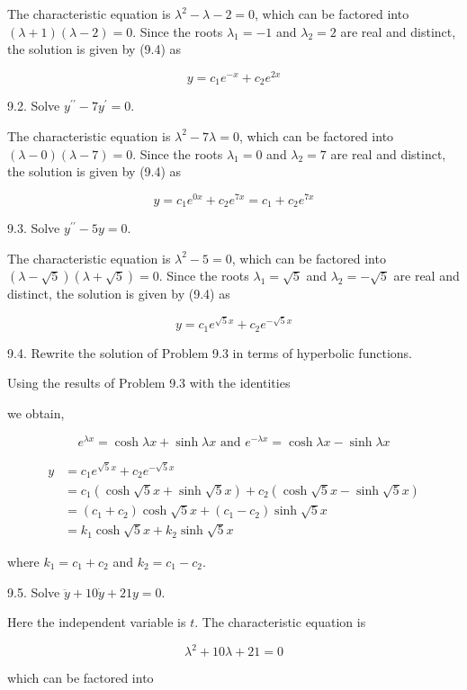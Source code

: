 \documentclass[10pt]{article}
\begin{document}
The characteristic equation is $\lambda^{2}-\lambda-2=0$, which can be factored into $(\lambda+1)(\lambda-2)=0$. Since the roots $\lambda_{1}=-1$ and $\lambda_{2}=2$ are real and distinct, the solution is given by (9.4) as

$$
y=c_{1} e^{-x}+c_{2} e^{2 x}
$$

9.2. Solve $y^{\prime \prime}-7 y^{\prime}=0$.

The characteristic equation is $\lambda^{2}-7 \lambda=0$, which can be factored into $(\lambda-0)(\lambda-7)=0$. Since the roots $\lambda_{1}=0$ and $\lambda_{2}=7$ are real and distinct, the solution is given by (9.4) as

$$
y=c_{1} e^{0 x}+c_{2} e^{7 x}=c_{1}+c_{2} e^{7 x}
$$

9.3. Solve $y^{\prime \prime}-5 y=0$.

The characteristic equation is $\lambda^{2}-5=0$, which can be factored into $(\lambda-\sqrt{5})(\lambda+\sqrt{5})=0$. Since the roots $\lambda_{1}=\sqrt{5}$ and $\lambda_{2}=-\sqrt{5}$ are real and distinct, the solution is given by (9.4) as

$$
y=c_{1} e^{\sqrt{5} x}+c_{2} e^{-\sqrt{5} x}
$$

9.4. Rewrite the solution of Problem 9.3 in terms of hyperbolic functions.

Using the results of Problem 9.3 with the identities

we obtain,

$$
e^{\lambda x}=\cosh \lambda x+\sinh \lambda x \text { and } e^{-\lambda x}=\cosh \lambda x-\sinh \lambda x
$$

$$
\begin{aligned}
y & =c_{1} e^{\sqrt{5} x}+c_{2} e^{-\sqrt{5} x} \\
& =c_{1}(\cosh \sqrt{5} x+\sinh \sqrt{5} x)+c_{2}(\cosh \sqrt{5} x-\sinh \sqrt{5} x) \\
& =\left(c_{1}+c_{2}\right) \cosh \sqrt{5} x+\left(c_{1}-c_{2}\right) \sinh \sqrt{5} x \\
& =k_{1} \cosh \sqrt{5} x+k_{2} \sinh \sqrt{5} x
\end{aligned}
$$

where $k_{1}=c_{1}+c_{2}$ and $k_{2}=c_{1}-c_{2}$.

9.5. Solve $\ddot{y}+10 \dot{y}+21 y=0$.

Here the independent variable is $t$. The characteristic equation is

$$
\lambda^{2}+10 \lambda+21=0
$$

which can be factored into
\end{document}
